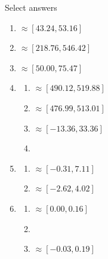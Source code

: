 \documentclass{article}
\begin{document}
\vspace{50pt}

Select answers\bigskip
\begin{enumerate}
    \item $\approx [43.24, 53.16]$
    
    \item $\approx [218.76, 546.42]$
    
    \item $\approx [50.00, 75.47]$
    
    \item 
    \begin{enumerate}
        \item $\approx [490.12, 519.88]$
        \item $\approx [476.99, 513.01]$
        \item $\approx [-13.36, 33.36]$
        \item 
    \end{enumerate}
    
    \item 
    \begin{enumerate}
        \item $\approx [-0.31, 7.11]$
        \item $\approx [-2.62, 4.02]$
    \end{enumerate}
    
    \item 
    \begin{enumerate}
        \item $\approx [0.00, 0.16]$
        \item 
        \item $\approx [-0.03, 0.19]$
    \end{enumerate}
\end{enumerate}
\end{document}
